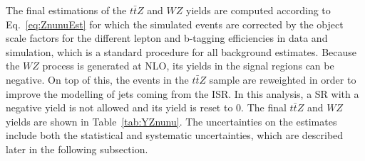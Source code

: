 The final estimations of the $t\bar{t}Z$ and $WZ$ yields are computed according to Eq.~\ref{eq:ZnunuEst} for which the simulated events are corrected by the object scale factors for the different lepton and b-tagging efficiencies in data and simulation, which is a standard procedure for all background estimates.   Because the $WZ$ process is generated at NLO, its yields in the signal regions can be negative. On top of this, the events in the $t\bar{t}Z$ sample are reweighted in order to improve the modelling of jets coming from the ISR. In this analysis, a SR with a negative yield is not allowed and its yield is reset to 0. The final $t\bar{t}Z$ and $WZ$ yields are shown in Table~\ref{tab:YZnunu}.  The uncertainties on the estimates include both the statistical and systematic uncertainties, which are described later in the following subsection.



